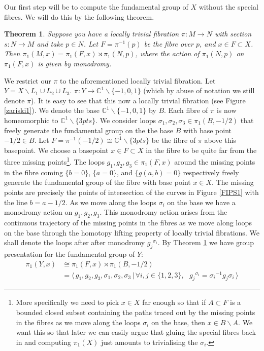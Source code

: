\documentclass[oneside]{amsart}
\newtheorem{thm}{Theorem}[section]
\theoremstyle{definition}
\theoremstyle{definition}
\theoremstyle{definition}
\theoremstyle{definition}
\newcommand{\CC}{\mathbb{C}}
\begin{document}
Our first step will be to compute the fundamental group of $X$ without the special fibres. We will do this by the following theorem.
\begin{thm}\cite[Theorem 2.1]{cogolludo}
\label{locallytriv}
Suppose you have a locally trivial fibration $\pi : M \to N$ with section $s : N\to M$ and take $p \in N $. Let $F = \pi^{-1}(p)$ be the fibre over $p$, and $x\in F\subset X$. Then $\pi_1(M,x) = \pi_1(F,x) \rtimes \pi_1(N,p)$, where the action of $\pi_1(N,p)$ on $\pi_1(F,x)$ is given by monodromy. 
\end{thm}
We restrict our $\pi$ to the aforementioned locally trivial fibration. Let $Y= X \backslash L_1 \cup L_2 \cup L_3$. $\pi : Y  \to \CC^1\backslash \{-1,0,1 \}$ (which by abuse of notation we still denote $\pi$). It is easy to see that this now a locally trivial fibration (see Figure \ref{zariski1}). We denote the base $\CC^1\backslash \{-1,0,1 \}$ by $B$. Each fibre of $\pi$ is now homeomorphic to $\CC^1 \backslash \{3 pts\}$. We consider loops $\sigma_1,\sigma_2, \sigma_3 \in \pi_1(B,-1/2)$ that freely generate the fundamental group on the the base $B$ with base point $-1/2 \in B$. Let $F=\pi^{-1}(-1/2)\cong \CC^1\backslash \{ 3 pts\}$ be the fibre of $\pi$ above this basepoint. We choose a basepoint $x \in F \subset X$ in the fibre to be quite far from the three missing points\footnote{More specifically we need to pick $x \in X$ far enough so that if $A\subset F$ is a bounded closed subset containing the paths traced out by the missing points in the fibres as we move along the loops $\sigma_i$ on the base, then $x \in B\backslash A$. We want this so that later we can easily argue that gluing the special fibres back in and computing $\pi_1(X)$ just amounts to trivialising the $\sigma_i$.}. The loops $g_1,g_2,g_3 \in \pi_1(F,x)$ around the missing points in the fibre coming $\{b=0 \}$, $\{ a=0\}$, and $\{g(a,b)=0\}$ respectively freely generate the fundamental group of the fibre with base point $x \in X$. The missing points are precisely the points of intersection of the curves in Figure \ref{FIPS1} with the line $b=a-1/2$. As we move along the loops $\sigma_i$ on the base we have a monodromy action on $g_1,g_2,g_3$. This monodromy action arises from the continuous trajectory of the missing points in the fibres as we move along loops on the base through the homotopy lifting property of locally trivial fibrations. We shall denote the loops after after monodromy ${g_j}^{\sigma_i}$. By Theorem \ref{locallytriv} we have group presentation for the fundamental group of $Y$:
\begin{align*}
    \pi_1(Y,x) &\cong \pi_1(F,x) \rtimes \pi_1(B,-1/2)  \\
    &=\langle \, g_1,g_2,g_3,\sigma_1,\sigma_2,\sigma_3 \, | \,\forall i,j \in \{1,2,3 \}, \: \: \: {g_j}^{\sigma_i}={\sigma_i}^{-1} g_j \sigma_i \, \rangle
\end{align*}
\end{document}
